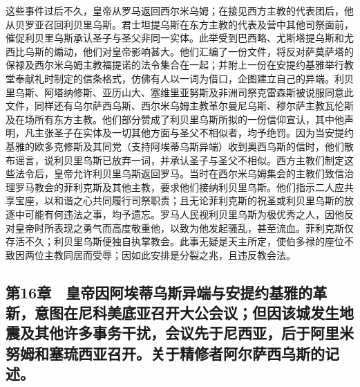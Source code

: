 这些事件过后不久，皇帝从罗马返回西尔米乌姆；在接见西方主教的代表团后，他从贝罗亚召回利贝里乌斯。君士坦提乌斯在东方主教的代表及营中其他司祭面前，催促利贝里乌斯承认圣子与圣父非同一实体。此举受到巴西略、尤斯塔提乌斯和尤西比乌斯的煽动，他们对皇帝影响甚大。他们汇编了一份文件，将反对萨莫萨塔的保禄及西尔米乌姆主教福提诺的法令集合在一起；并附上一份在安提约基雅举行教堂奉献礼时制定的信条格式，仿佛有人以一词为借口，企图建立自己的异端。利贝里乌斯、阿塔纳修斯、亚历山大、塞维里亚努斯及非洲司祭克雷森斯被说服同意此文件，同样还有乌尔萨西乌斯、西尔米乌姆主教革尔曼尼乌斯、穆尔萨主教瓦伦斯及在场所有东方主教。他们部分赞成了利贝里乌斯所拟的一份信仰宣认，其中他声明，凡主张圣子在实体及一切其他方面与圣父不相似者，均予绝罚。因为当安提约基雅的欧多克修斯及其同党（支持阿埃蒂乌斯异端）收到奥西乌斯的信时，他们散布谣言，说利贝里乌斯已放弃一词，并承认圣子与圣父不相似。西方主教们制定这些法令后，皇帝允许利贝里乌斯返回罗马。当时在西尔米乌姆集会的主教们致信治理罗马教会的菲利克斯及其他主教，要求他们接纳利贝里乌斯。他们指示二人应共享宝座，以和谐之心共同履行司祭职责；且无论菲利克斯的祝圣或利贝里乌斯的放逐中可能有何违法之事，均予遗忘。罗马人民视利贝里乌斯为极优秀之人，因他反对皇帝时所表现之勇气而高度敬重他，以致为他发起骚乱，甚至流血。菲利克斯仅存活不久；利贝里乌斯便独自执掌教会。此事无疑是天主所定，使伯多禄的座位不致因两位主教同居而受辱；因如此安排是分裂之兆，且违反教会法。\par


\subsection{第16章　皇帝因阿埃蒂乌斯异端与安提约基雅的革新，意图在尼科美底亚召开大公会议；但因该城发生地震及其他许多事务干扰，会议先于尼西亚，后于阿里米努姆和塞琉西亚召开。关于精修者阿尔萨西乌斯的记述。}


